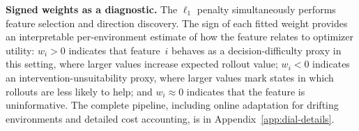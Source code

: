 \textbf{Signed weights as a diagnostic.}
The $\ell_1$ penalty simultaneously performs feature selection and direction discovery. The sign of each fitted weight provides an interpretable per-environment estimate of how the feature relates to optimizer utility: $w_i > 0$ indicates that feature~$i$ behaves as a decision-difficulty proxy in this setting, where larger values increase expected rollout value; $w_i < 0$ indicates an intervention-unsuitability proxy, where larger values mark states in which rollouts are less likely to help; and $w_i \approx 0$ indicates that the feature is uninformative. The complete pipeline, including online adaptation for drifting environments and detailed cost accounting, is in Appendix~\ref{app:dial-details}.